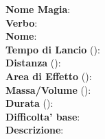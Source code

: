 \flushleft \textbf{Nome Magia}: \\ 
\textbf{Verbo}: \\
\textbf{Nome}: \\
\textbf{Tempo di Lancio} (): \\
\textbf{Distanza} (): \\
\textbf{Area di Effetto} (): \\
\textbf{Massa/Volume} (): \\
\textbf{Durata} (): \\
\textbf{Difficolta' base}: \\
\textbf{Descrizione}: \\

